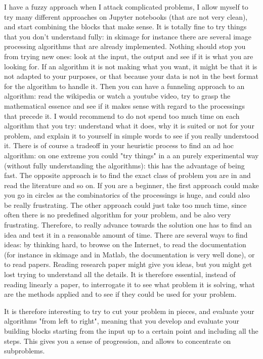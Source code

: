\documentclass[24pt]{article}
\begin{document}
I have a fuzzy approach when I attack complicated problems, I allow myself to try many different approaches on Jupyter notebooks (that are not very clean), and start combining the blocks that make sense. It is totally fine to try things that you don't understand fully: in skimage for instance there are several image processing algorithms that are already implemented. Nothing should stop you from trying new ones: look at the input, the output and see if it is what you are looking for. If an algorithm it is not making what you want, it might be that it is not adapted to your purposes, or that because your data is not in the best format for the algorithm to handle it. Then you can have a funneling approach to an algorithm: read the wikipedia or watch a  youtube video, try to grasp the mathematical essence and see if it makes sense with regard to the processings that precede it. I would recommend to do not spend too much time on each algorithm that you try: understand what it does, why it is suited or not for your problem, and explain it to yourself in simple words to see if you really understood it.  There is of course a tradeoff in your heuristic process to find an ad hoc algorithm: on one extreme you could "try things"  in a an purely experimental way (without fully understanding the algorithms): this has the advantage of being fast. The opposite approach  is to find the exact class of problem you are in and read the literature and so on. If you are a beginner, the first approach could make you go in circles as the combinatorics of the processings is huge, and could also be really frustrating.  The other approach could just take too much time, since often there is no predefined algorithm for your problem, and be also very frustrating. Therefore, to really advance towards the solution one has to find an idea and test it in a reasonable amount of time. There are several ways to find ideas:  by thinking hard, to browse on the Internet, to read the documentation (for instance in skimage and in Matlab, the documentation is very well done), or to read papers. Reading research paper might give you ideas, but  you might get lost trying to understand all the details. It is therefore essential, instead of reading linearly a paper, to interrogate it to see what problem it is solving, what are the methods applied and to see if they could be used for your problem. 



It is therefore interesting to try to cut your problem in pieces, and evaluate your algorithms "from left to right", meaning that you develop and evaluate your building blocks starting from the input up to a certain point and including all the steps. This gives you a sense of progression, and allows to concentrate on subproblems.
\end{document}
